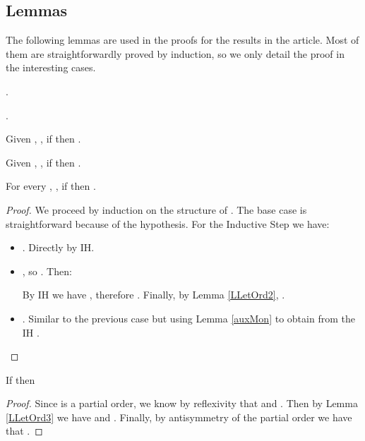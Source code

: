 



\subsection{Lemmas}

The following lemmas are used in the proofs for the results in the article. Most of them are straightforwardly proved by induction, so we only detail the proof in the interesting cases.




\begin{lemma}\label{shellPatterns}
.
\end{lemma}



\begin{lemma}\label{lemma:crwlPatterns}
.
\end{lemma}



\begin{lemma}\label{LLetOrd2}
 Given , , if  then .
\end{lemma}


\begin{lemma}\label{auxMon}
Given , , if  then .
\end{lemma}



\begin{lemma}\label{LLetOrd3}
For every , , if  then .
\end{lemma}
\begin{proof}\label{DEMO_LLetOrd3}
We proceed by induction on the structure of . The base case is straightforward because of the hypothesis. For the Inductive Step we have:
\begin{itemize}
         \item . Directly by IH.
         \item , so . Then:

 By IH we have , therefore . Finally, by Lemma \ref{LLetOrd2}, .
         \item . Similar to the previous case but using Lemma \ref{auxMon} to obtain   from the IH .
\end{itemize}
\end{proof}

\begin{lemma}\label{lemma:context}
If  then 
\end{lemma}
\begin{proof}\label{DEMO_lemma:context}
Since  is a partial order, we know by reflexivity that  and . Then by Lemma \ref{LLetOrd3} we have  and . Finally, by antisymmetry of the partial order  we have that .
\end{proof}

